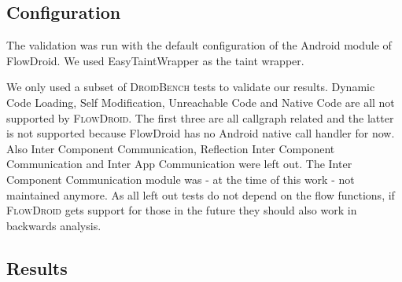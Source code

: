 \documentclass[../draft.tex]{subfiles}
\begin{document}
    \subsection{Configuration}
    The validation was run with the default configuration of the Android module of FlowDroid. We used EasyTaintWrapper as the taint wrapper.

    We only used a subset of \textsc{DroidBench} tests to validate our results. Dynamic Code Loading, Self Modification, Unreachable Code and Native Code are all not supported by \textsc{FlowDroid}. The first three are all callgraph related and the latter is not supported because FlowDroid has no Android native call handler for now.
    Also Inter Component Communication, Reflection Inter Component Communication and Inter App Communication were left out. The Inter Component Communication module was - at the time of this work - not maintained anymore. 
    As all left out tests do not depend on the flow functions, if \textsc{FlowDroid} gets support for those in the future they should also work in backwards analysis.

    \subsection{Results}
\end{document}
